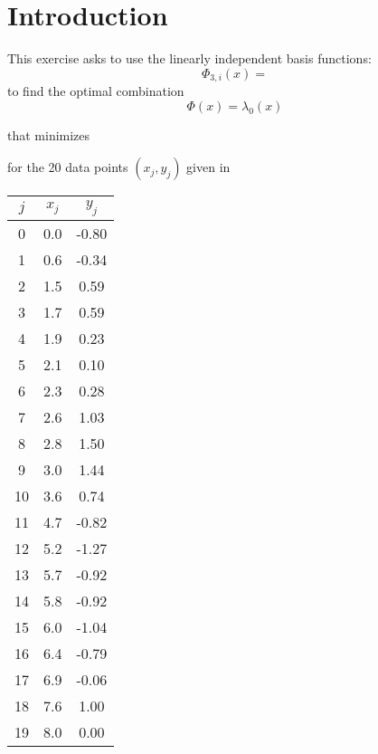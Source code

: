 \documentclass{article}
\begin{document}

\section{Introduction}\label{sec:intro}
This exercise asks to use the linearly independent basis functions:
$$\Phi_{3,i}(x)=$$
to find the optimal combination
$$\Phi(x)=\lambda_0(x)$$

that minimizes

for the 20 data points $(x_j,y_j)$ given in

\begin{table}[!ht]
\large        %
\centering    %
\begin{tabular}{|c|c|c|}
\hline
$j$ & $x_j$ & $y_j$ \\     %
\hline
0 & 0.0 & -0.80\\
1 & 0.6 & -0.34\\
2 & 1.5 & 0.59\\
3 & 1.7 & 0.59\\
4 & 1.9 & 0.23\\
5 & 2.1 & 0.10\\
6 & 2.3 & 0.28\\
7 & 2.6 & 1.03\\
8 & 2.8 & 1.50\\
9 & 3.0 & 1.44\\
10 & 3.6 & 0.74\\
11 & 4.7 & -0.82\\
12 & 5.2 & -1.27\\
13 & 5.7 & -0.92\\
14 & 5.8 & -0.92\\
15 & 6.0 & -1.04\\
16 & 6.4 & -0.79\\
17 & 6.9 & -0.06\\
18 & 7.6 & 1.00\\
19 & 8.0 & 0.00\\    
\hline
\end{tabular}
\end{table}
\end{document}
